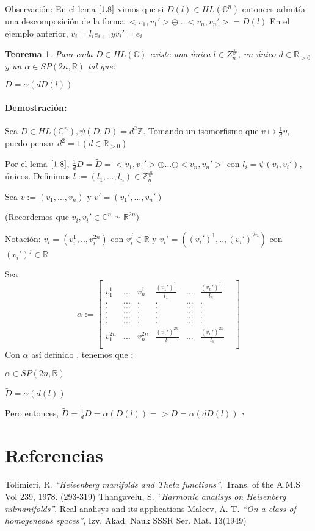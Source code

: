 \documentclass[12pt]{article}
\newtheorem{theorem}{Teorema}
\newenvironment{proof}{\paragraph{Demostración:}}{\hfill$\square$}
\begin{document}
 Observación: En el lema $\ref{1.8}$ vimos que si $D(l) \in HL(\mathbb{C}^n)$ entonces admitía una descomposición de la forma 
 $<v_1,v_1'>\oplus ... <v_n,v_n'>= D(l)$
 En el ejemplo anterior, $v_i=l_i e_{i+1} y v_i'=e_i$
 

\begin{theorem}
 Para cada $D \in HL(\mathbb{C})$ existe una única $l \in Z_n^{\#}$, un único $d \in \mathbb{R}_{>0}$ y un $\alpha \in SP(2n,\mathbb{R})$ tal que:
 
 $D=\alpha(d D(l))$
\end{theorem}

\begin{proof}
 Sea $D \in HL(\mathbb{C}^n), \psi(D,D)=d^2 \mathbb{Z}$. Tomando un isomorfismo que $v \mapsto \frac{1}{d} v$, puedo pensar $d^2=1 (d\in \mathbb{R}_{>0})$
 
 Por el lema $\ref{1.8}$, $\frac{1}{d} D = \tilde{D} = <v_1,v_1'> \oplus...\oplus <v_n,v_n'>$ con $l_i=\psi(v_i,v_i')$, únicos. 
 Definimos $l:=(l_1,...,l_n) \in \mathbb{Z}_n^{\#}$
 
 Sea $v:=(v_1,...,v_n)$ y $v'=(v_1',...,v_n')$
 
 (Recordemos que $v_i,v_i' \in \mathbb{C}^n \simeq \mathbb{R}^{2n})$
 
 Notación: $v_i=(v_i^1,..,v_i^{2n})$ con $v_i^j \in \mathbb{R}$ y $v_i'=((v_i')^1,..,(v_i')^{2n})$ con $(v_i')^j \in \mathbb{R}$
 
 Sea 
 $$\alpha:= \begin{bmatrix}
 v_1^1 & ... &v_n^1 & \frac{(v_1')^1}{l_1} &... &\frac{(v_n')^1}{l_n} &\\ 
 .& ... &. &. &... &. &\\
 .& ... &. &. &... &. &\\
 .& ... &. &. &... &. &\\
 .& ... &. &. &... &. &\\
 .& ... &. &. &... &. &\\
 v_1^{2n}&...&v_n^{2n} &\frac{(v_1')^{2n}}{l_1}  &...&\frac{(v_n')^{2n}}{l_1}  &\\ 
\end{bmatrix}
$$
Con $\alpha$ así definido , tenemos que :

$\alpha \in  SP(2n,\mathbb{R})$

$\tilde{D} = \alpha(d(l)) $

Pero entonces, $\tilde{D}=\frac{1}{d} D = \alpha(D(l)) => D=\alpha(d D(l))$
\end{proof}






 \section{Referencias}
  \begin{thebibliography}{1}
   Tolimieri, R.   \emph{``Heisenberg manifolds and Theta functions''}, Trans. of the A.M.S Vol 239, 1978. (293-319)
   Thangavelu, S.  \emph{``Harmonic analisys on Heisenberg nilmanifolds''}, Real analisys and its applications
   Malcev, A. T.  \emph{``On a class of homogeneous spaces''}, Izv. Akad. Nauk SSSR Ser. Mat. 13(1949)
  
  \end{thebibliography}
\end{document}
